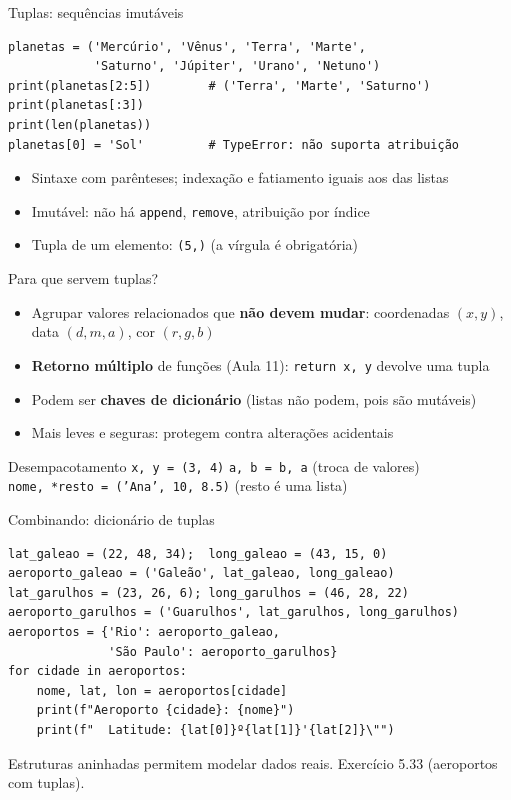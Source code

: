 \documentclass[aspectratio=169,10pt,t]{beamer}
\begin{document}
\begin{frame}[fragile]{Tuplas: sequências imutáveis}
\begin{lstlisting}
planetas = ('Mercúrio', 'Vênus', 'Terra', 'Marte',
            'Saturno', 'Júpiter', 'Urano', 'Netuno')
print(planetas[2:5])        # ('Terra', 'Marte', 'Saturno')
print(planetas[:3])
print(len(planetas))
planetas[0] = 'Sol'         # TypeError: não suporta atribuição
\end{lstlisting}
  \begin{itemize}
    \item Sintaxe com parênteses; indexação e fatiamento iguais aos das listas
    \item \alert{Imutável}: não há \texttt{append}, \texttt{remove}, atribuição por índice
    \item Tupla de um elemento: \texttt{(5,)} (a vírgula é obrigatória)
  \end{itemize}
\end{frame}

\begin{frame}{Para que servem tuplas?}
  \begin{itemize}
    \item Agrupar valores relacionados que \textbf{não devem mudar}: coordenadas \((x,y)\), data \((d,m,a)\), cor \((r,g,b)\)
    \item \textbf{Retorno múltiplo} de funções (Aula 11): \texttt{return x, y} devolve uma tupla
    \item Podem ser \textbf{chaves de dicionário} (listas não podem, pois são mutáveis)
    \item Mais leves e seguras: protegem contra alterações acidentais
  \end{itemize}
  \begin{exampleblock}{Desempacotamento}
    \texttt{x, y = (3, 4)} \hspace{2em} \texttt{a, b = b, a} (troca de valores)\\
    \texttt{nome, *resto = ('Ana', 10, 8.5)} \hspace{1em} \footnotesize(resto é uma lista)
  \end{exampleblock}
\end{frame}

\begin{frame}[fragile]{Combinando: dicionário de tuplas}
\begin{lstlisting}
lat_galeao = (22, 48, 34);  long_galeao = (43, 15, 0)
aeroporto_galeao = ('Galeão', lat_galeao, long_galeao)
lat_garulhos = (23, 26, 6); long_garulhos = (46, 28, 22)
aeroporto_garulhos = ('Guarulhos', lat_garulhos, long_garulhos)
aeroportos = {'Rio': aeroporto_galeao,
              'São Paulo': aeroporto_garulhos}
for cidade in aeroportos:
    nome, lat, lon = aeroportos[cidade]
    print(f"Aeroporto {cidade}: {nome}")
    print(f"  Latitude: {lat[0]}º{lat[1]}'{lat[2]}\"")
\end{lstlisting}
  \small Estruturas aninhadas permitem modelar dados reais. Exercício 5.33 (aeroportos com tuplas).\\
\end{frame}
\end{document}
